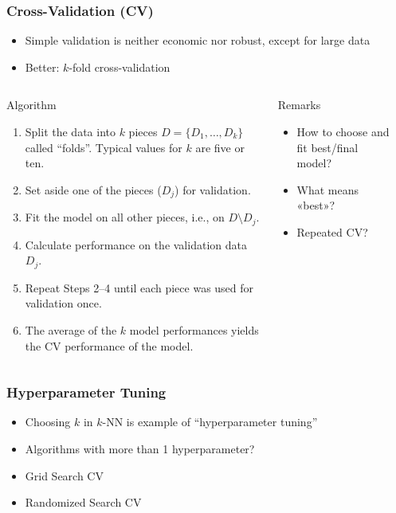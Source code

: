 \documentclass[
    utf8,
    aspectratio=169
]{beamer}  %
\begin{document}
\begin{frame}
	\frametitle{Cross-Validation (CV)}
	
	\begin{itemize}
		\item Simple validation is neither economic nor robust, except for large data
		\item Better: $k$-fold cross-validation
	\end{itemize}
	
	\vfill
	
	\begin{columns}[onlytextwidth]
		\begin{block}{Algorithm}
			\begin{enumerate}
				\item Split the data into $k$ pieces $D = \{D_1, \dots, D_k\}$ called ``folds''. Typical values for $k$ are five or ten.
				\item Set aside one of the pieces ($D_j$) for validation.
				\item Fit the model on all other pieces, i.e., on $D \setminus D_j$.
				\item Calculate performance on the validation data $D_j$.
				\item Repeat Steps 2--4 until each piece was used for validation once.
				\item The average of the $k$ model performances yields the \alert{CV performance} of the model.
			\end{enumerate}
		\end{block}
		
		\begin{alertblock}{Remarks}
			\begin{itemize}
				\item How to choose and fit best/final model? 
				\item What means «best»?
				\item Repeated CV?
			\end{itemize}
		\end{alertblock}
	
		\begin{example}
		\end{example}
	\end{columns}
\end{frame}

\begin{frame}
	\frametitle{Hyperparameter Tuning}
	\begin{itemize}
		\item Choosing $k$ in $k$-NN is example of \alert{``hyperparameter tuning''}
		\item Algorithms with more than 1 hyperparameter?
		\item Grid Search CV
		\item Randomized Search CV
	\end{itemize}
\end{frame}
\end{document}
